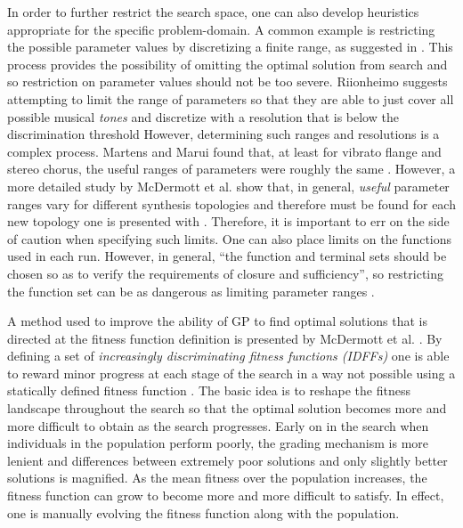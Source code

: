 \documentclass[a4paper,12pt]{report} 	%
\numberwithin{figure}{chapter}
\numberwithin{table}{chapter}
\numberwithin{equation}{chapter}
\begin{document}
\begin{flushleft}
In order to further restrict the search space, one can also develop heuristics appropriate for the specific problem-domain. A common example is restricting the possible parameter values by discretizing a finite range, as suggested in \cite[p. 6]{Riionheimo:2003qo}. This process provides the possibility of omitting the optimal solution from search and so restriction on parameter values should not be too severe. Riionheimo suggests attempting to limit the range of parameters so that they are able to just cover all possible musical \emph{tones} and discretize with a resolution that is below the discrimination threshold \cite[p. 6]{Riionheimo:2003qo} However, determining such ranges and resolutions is a complex process. Martens and Marui found that, at least for vibrato flange and stereo chorus, the useful ranges of parameters were roughly the same \cite[p. 4]{Martens:2009lo}. However, a more detailed study by McDermott et al. show that, in general, \emph{useful} parameter ranges vary for different synthesis topologies and therefore must be found for each new topology one is presented with \cite[p. 5]{McDermott:2005xq}. Therefore, it is important to err on the side of caution when specifying such limits. One can also place limits on the functions used in each run. However, in general, ``the function and terminal sets should be chosen so as to verify the requirements of closure and sufficiency'', so restricting the function set can be as dangerous as limiting parameter ranges \cite[p. 22]{Vanneschi:2004le}. 

A method used to improve the ability of GP to find optimal solutions that is directed at the fitness function definition is presented by McDermott et al. \cite{2006ud}. By defining a set of \emph{increasingly discriminating fitness functions (IDFFs)} one is able to reward minor progress at each stage of the search in a way not possible using a statically defined fitness function \cite[p. 15]{2006ud}. The basic idea is to reshape the fitness landscape throughout the search so that the optimal solution becomes more and more difficult to obtain as the search progresses. Early on in the search when individuals in the population perform poorly, the grading mechanism is more lenient and differences between extremely poor solutions and only slightly better solutions is magnified. As the mean fitness over the population increases, the fitness function can grow to become more and more difficult to satisfy. In effect, one is manually evolving the fitness function along with the population.


\end{flushleft}
\end{document}
